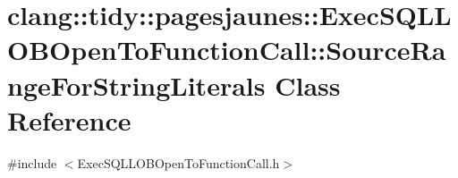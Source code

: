 \hypertarget{classclang_1_1tidy_1_1pagesjaunes_1_1_exec_s_q_l_l_o_b_open_to_function_call_1_1_source_range_for_string_literals}{}\section{clang\+:\+:tidy\+:\+:pagesjaunes\+:\+:Exec\+S\+Q\+L\+L\+O\+B\+Open\+To\+Function\+Call\+:\+:Source\+Range\+For\+String\+Literals Class Reference}
\label{classclang_1_1tidy_1_1pagesjaunes_1_1_exec_s_q_l_l_o_b_open_to_function_call_1_1_source_range_for_string_literals}


{\ttfamily \#include $<$Exec\+S\+Q\+L\+L\+O\+B\+Open\+To\+Function\+Call.\+h$>$}

